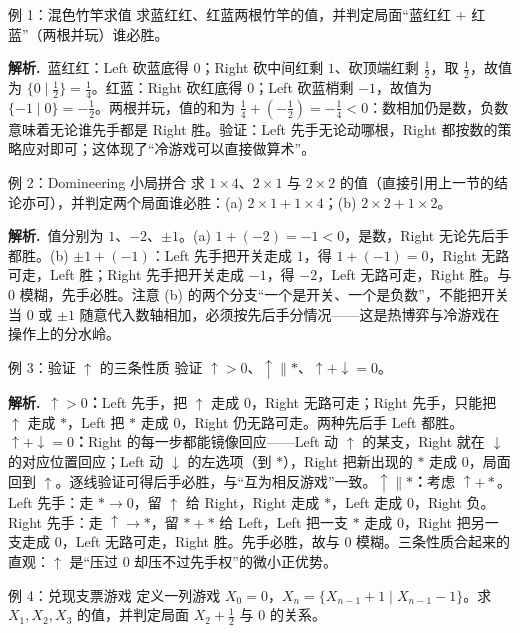 \documentclass[UTF8,a4paper,11pt,oneside,openany,fontset=fandol]{ctexbook}
\theoremstyle{definition}
\newcommand{\sol}{\par\noindent\textbf{解析.}\ }
\begin{document}
\begin{problem}{例 1：混色竹竿求值}
求蓝红红、红蓝两根竹竿的值，并判定局面“蓝红红 $+$ 红蓝”（两根并玩）谁必胜。
\end{problem}

\sol 蓝红红：Left 砍蓝底得 $0$；Right 砍中间红剩 $1$、砍顶端红剩 $\tfrac12$，取 $\tfrac12$，故值为 $\{0\mid\tfrac12\}=\tfrac14$。红蓝：Right 砍红底得 $0$；Left 砍蓝梢剩 $-1$，故值为 $\{-1\mid 0\}=-\tfrac12$。两根并玩，值的和为 $\tfrac14+(-\tfrac12)=-\tfrac14<0$：数相加仍是数，负数意味着无论谁先手都是 Right 胜。验证：Left 先手无论动哪根，Right 都按数的策略应对即可；这体现了“冷游戏可以直接做算术”。

\begin{problem}{例 2：Domineering 小局拼合}
求 $1\times4$、$2\times1$ 与 $2\times2$ 的值（直接引用上一节的结论亦可），并判定两个局面谁必胜：(a) $2\times1+1\times4$；(b) $2\times2+1\times2$。
\end{problem}

\sol 值分别为 $1$、$-2$、$\pm1$。(a) $1+(-2)=-1<0$，是数，Right 无论先后手都胜。(b) $\pm1+(-1)$：Left 先手把开关走成 $1$，得 $1+(-1)=0$，Right 无路可走，Left 胜；Right 先手把开关走成 $-1$，得 $-2$，Left 无路可走，Right 胜。与 $0$ 模糊，先手必胜。注意 (b) 的两个分支“一个是开关、一个是负数”，不能把开关当 $0$ 或 $\pm1$ 随意代入数轴相加，必须按先后手分情况——这是热博弈与冷游戏在操作上的分水岭。

\begin{problem}{例 3：验证 $\uparrow$ 的三条性质}
验证 $\uparrow>0$、$\uparrow\parallel\ast$、$\uparrow+\downarrow=0$。
\end{problem}

\sol \textbf{$\uparrow>0$：}Left 先手，把 $\uparrow$ 走成 $0$，Right 无路可走；Right 先手，只能把 $\uparrow$ 走成 $\ast$，Left 把 $\ast$ 走成 $0$，Right 仍无路可走。两种先后手 Left 都胜。\textbf{$\uparrow+\downarrow=0$：}Right 的每一步都能镜像回应——Left 动 $\uparrow$ 的某支，Right 就在 $\downarrow$ 的对应位置回应；Left 动 $\downarrow$ 的左选项（到 $\ast$），Right 把新出现的 $\ast$ 走成 $0$，局面回到 $\uparrow$。逐线验证可得后手必胜，与“互为相反游戏”一致。\textbf{$\uparrow\parallel\ast$：}考虑 $\uparrow+\ast$。Left 先手：走 $\ast\to0$，留 $\uparrow$ 给 Right，Right 走成 $\ast$，Left 走成 $0$，Right 负。Right 先手：走 $\uparrow\to\ast$，留 $\ast+\ast$ 给 Left，Left 把一支 $\ast$ 走成 $0$，Right 把另一支走成 $0$，Left 无路可走，Right 胜。先手必胜，故与 $0$ 模糊。三条性质合起来的直观：$\uparrow$ 是“压过 $0$ 却压不过先手权”的微小正优势。

\begin{problem}{例 4：兑现支票游戏}
定义一列游戏 $X_0=0$，$X_{n}=\{X_{n-1}+1\mid X_{n-1}-1\}$。求 $X_1,X_2,X_3$ 的值，并判定局面 $X_2+\tfrac12$ 与 $0$ 的关系。
\end{problem}
\end{document}
